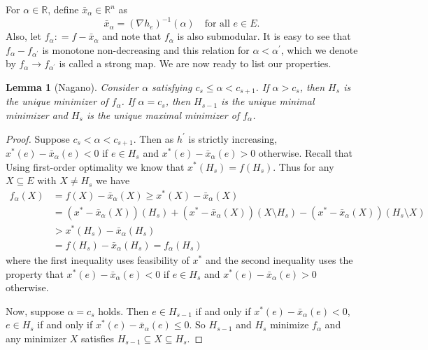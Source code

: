 \documentclass{article}
\newtheorem{lemma}{Lemma}
\begin{document}
For $\alpha \in \mathbb{R}$, define $\bar{x}_\alpha \in \mathbb{R}^n$ as
\begin{equation} \label{alpha}
    \bar{x}_\alpha = (\nabla h_e)^{-1}(\alpha) \quad \text{for all $e \in E$}.
\end{equation}
Also, let $f_\alpha: = f - \bar{x}_\alpha$ and note that $f_\alpha$ is also submodular. It is easy to see that $f_\alpha - f_{\alpha^\prime}$ is monotone non-decreasing and this relation for $\alpha < \alpha^\prime$, which we denote by $f_\alpha \to f_{\alpha^\prime}$ is called a strong map. We are now ready to list our properties.

\begin{lemma}[Nagano] \label{gradient space}
Consider $\alpha$ satisfying $c_s \leq \alpha < c_{s+1}$. If $ \alpha > c_s$, then $H_s$ is the unique minimizer of $f_\alpha$. If $ \alpha = c_s$, then $H_{s-1}$ is the unique minimal minimizer and $H_s$ is the unique maximal minimizer of $f_\alpha$.
\end{lemma}

\begin{proof}
Suppose $c_s < \alpha < c_{s+1}$. Then  as $h^\prime$ is strictly increasing, $x^*(e) - \bar{x}_\alpha(e) < 0$ if $e \in H_s$ and $x^*(e) - \bar{x}_\alpha(e) > 0$ otherwise. Recall that Using first-order optimality we know that $x^*(H_s) = f(H_s)$. Thus for any $X  \subseteq E$ with $X\neq H_s$ we have
\begin{align*}
    f_\alpha (X)  &= f(X) - \bar{x}_\alpha(X) \geq x^*(X) - \bar{x}_\alpha(X)\\
    & = (x^* - \bar{x}_\alpha(X)) (H_s) +  (x^* - \bar{x}_\alpha(X))(X \setminus H_s) - (x^* - \bar{x}_\alpha(X))(H_s \setminus X)\\
    &> x^*(H_s) - \bar{x}_\alpha(H_s)\\
    &= f(H_s) - \bar{x}_\alpha(H_s) =  f_\alpha (H_s)
\end{align*}
where the first inequality uses feasibility of $x^*$ and the second inequality uses the property that $x^*(e) - \bar{x}_\alpha(e) < 0$ if $e \in H_s$ and $x^*(e) - \bar{x}_\alpha(e) > 0$ otherwise.

Now, suppose $ \alpha = c_s$ holds. Then $e \in H_{s-1}$ if and only if
$x^*(e) - \bar{x}_\alpha(e) < 0$, $e \in H_{s}$ if and only if
$x^*(e) - \bar{x}_\alpha(e) \leq 0$. So $H_{s-1}$ and $H_s$ minimize $f_\alpha$ and any minimizer $X$ satisfies $H_{s-1} \subseteq X \subseteq H_s$.
\end{proof}
\end{document}

